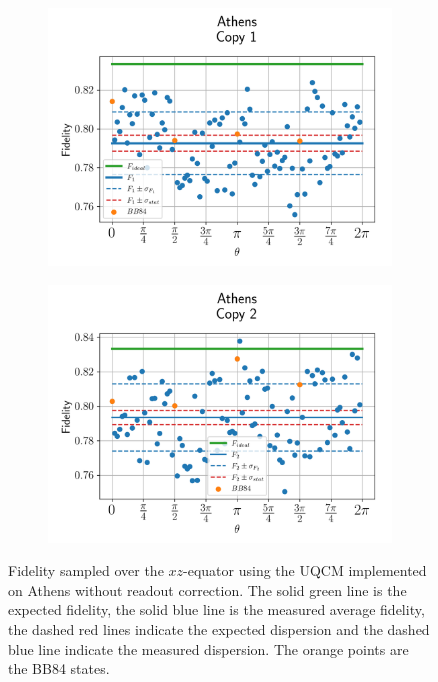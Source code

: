 \begin{figure}[H]
    \centering
    \begin{subfigure}{.45\textwidth}
      \centering
      \includegraphics[width=\textwidth]{Figures/UQCM/IBM/OnlyEquator/results_athens_copy1.png}
    \end{subfigure}%
    \begin{subfigure}{.45\textwidth}
      \centering
      \includegraphics[width=\textwidth]{Figures/UQCM/IBM/OnlyEquator/results_athens_copy2.png}
    \end{subfigure}
    \caption{Fidelity sampled over the $xz$-equator using the UQCM implemented on Athens without readout correction. The solid green line is the expected fidelity, the solid blue line is the measured average fidelity, the dashed red lines indicate the expected dispersion and the dashed blue line indicate the measured dispersion. The orange points are the BB84 states.}
\end{figure}


